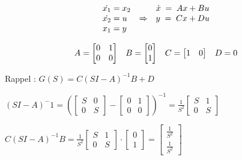 \documentclass[document.tex]{subfiles}
\begin{document}
\begin{equation}
\begin{array}{l c c}
		\dot{x_1} = x_2 & \; & \dot{x} \; = \; Ax + Bu \\
		\dot{x_2} = u   & \Rightarrow & y       \; = \; Cx + Du\\
		x_1 = y
\end{array}
\end{equation}
	
\begin{equation}
\begin{array}{c c c c}
	A = \begin{bmatrix}
	0 & 1 \\ 0 & 0
	\end{bmatrix} & B = \begin{bmatrix}
	0 \\ 1
	\end{bmatrix} &
	C = \begin{bmatrix}
	1 & 0
	\end{bmatrix} &
	D = 0
\end{array}
\end{equation}


\begin{flushleft}
	Rappel : $G(S) = C(SI-A)^{-1}B + D$
\end{flushleft}

\begin{center}
$ (SI-A)^-{1} = (\begin{bmatrix} S & 0 \\ 0 & S \end{bmatrix} - \begin{bmatrix} 0 & 1 \\ 0 & 0 \end{bmatrix})^{-1} = \frac{1}{S^2} \begin{bmatrix} S & 1 \\ 0 & S \end{bmatrix} $
\end{center}

\begin{center}
$ C(SI-A)^{-1}B = \frac{1}{S^2} \begin{bmatrix} S & 1 \\ 0 & S \end{bmatrix} \cdot \begin{bmatrix} 0 \\ 1 \end{bmatrix} = \begin{bmatrix} \frac{1}{S^2} \\ \frac{1}{S^2} \end{bmatrix} $
\end{center}
\end{document}
